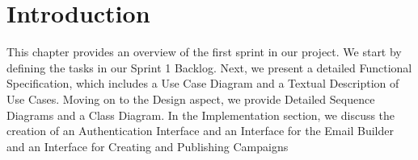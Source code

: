 \section*{Introduction}

This chapter provides an overview of the first sprint in our project. We start by defining the tasks in our Sprint 1 Backlog. Next, we present a detailed Functional Specification, which includes a Use Case Diagram and a Textual Description of Use Cases. Moving on to the Design aspect, we provide Detailed Sequence Diagrams and a Class Diagram. In the Implementation section, we discuss the creation of an Authentication Interface and an Interface for the Email Builder and an Interface for Creating and Publishing Campaigns

